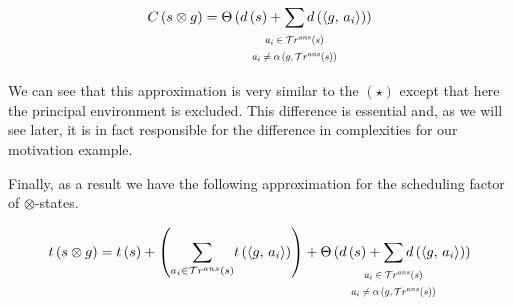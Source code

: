 \begin{lemma}

\[
C\,(s \otimes g) =
\Theta\,(d\,(s) + \smashoperator[lr]{\sum\limits_{\begin{array}{c}
                                                                                   \scalebox{0.7}{$a_i \in \tra{s}$} \\
                                                                                   \scalebox{0.7}{$a_i \ne \alpha\,(g, \tra{s}) $} \\
                                                                              \end{array}}} d\,(\taskst{g}{a_i}))	
\]
\end{lemma}

We can see that this approximation is very similar to the $(\star)$ except that here the principal environment is excluded. This difference
is essential and, as we will see later, it is in fact responsible for the difference in complexities for our motivation example.

Finally, as a result we have the following approximation for the scheduling factor of $\otimes$-states.

\begin{corollary}
\[
 t\,(s \otimes g)  =  t\,(s) + \left({\sum\limits_{a_i \in \tra{s}}} t\,(\taskst{g}{a_i})\right) +
 \Theta\,(d\,(s) + \smashoperator[lr]{\sum\limits_{\begin{array}{c}
                                                                                   \scalebox{0.7}{$a_i \in \tra{s}$} \\
                                                                                   \scalebox{0.7}{$a_i \ne \alpha\,(g, \tra{s}) $} \\
                                                                              \end{array}}} d\,(\taskst{g}{a_i}))	
\]
\end{corollary}










